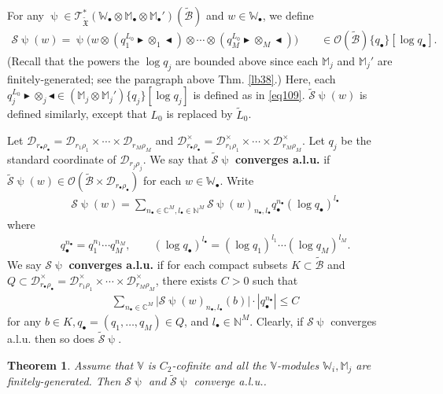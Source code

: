\documentclass[11pt,b5paper,notitlepage]{article}
\theoremstyle{definition}
\theoremstyle{plain}
\newtheorem{thm}[df]{Theorem}
\newcommand{\fk}{\mathfrak}
\newcommand{\mc}{\mathcal}
\newcommand{\wtd}{\widetilde}
\newcommand{\scr}{\mathscr}
\newcommand{\blt}{\bullet}
\newcommand{\Vbb}{\mathbb V}
\newcommand{\Wbb}{\mathbb W}
\newcommand{\Mbb}{\mathbb M}
\newcommand{\Cbb}{\mathbb C}
\newcommand{\Nbb}{\mathbb N}
\newcommand{\btl}{\blacktriangleleft}
\newcommand{\btr}{\blacktriangleright}
\numberwithin{equation}{section}
\begin{document}
For any $\uppsi\in\scr T_{\wtd{\fk X}}^*(\Wbb_\blt\otimes\Mbb_\blt\otimes\Mbb_\blt')(\wtd{\mc B})$ and $w\in\Wbb_\blt$, \index{S@$\wtd{\mc S}\uppsi,\mc S\uppsi$} we define   
\begin{align}
\mc S\uppsi(w)=\uppsi\Big(w\otimes (q_1^{ L_0}\btr\otimes_1\btl)\otimes\cdots\otimes (q_M^{ L_0}\btr\otimes_M\btl)\Big)\qquad \in\scr O(\wtd{\mc B})\{q_\blt\}[\log q_\blt].
\end{align}
(Recall that the powers the $\log q_j$ are bounded above since each $\Mbb_j$ and $\Mbb_j'$ are finitely-generated; see the paragraph above Thm. \ref{lb38}.) Here, each $q_j^{L_0}\btr\otimes_j\btl\in(\Mbb_j\otimes\Mbb_j')\{q_j\}[\log q_j]$ is defined as in \eqref{eq109}. $\wtd{\mc S}\uppsi(w)$ is defined similarly, except that $L_0$ is replaced by $\wtd L_0$.


Let $\mc D_{r_\blt\rho_\blt}=\mc D_{r_1\rho_1}\times\cdots\times\mc D_{r_M\rho_M}$ and $\mc D_{r_\blt\rho_\blt}^\times=\mc D_{r_1\rho_1}^\times\times\cdots\times\mc D_{r_M\rho_M}^\times$. Let $q_j$ be the standard coordinate of $\mc D_{r_j\rho_j}$. We say that $\wtd{\mc S}\uppsi$ \textbf{converges a.l.u.} if $\wtd{\mc S}\uppsi(w)\in\scr O(\wtd{\mc B}\times\mc D_{r_\blt\rho_\blt})$ for each $w\in\Wbb_\blt$. Write
\begin{align*}
\mc S\uppsi(w)=\sum_{n_\blt\in\Cbb^M,l_\blt\in\Nbb^M}\mc S\uppsi(w)_{n_\blt,l_\blt}q_\blt^{n_\blt}(\log q_\blt)^{l_\blt}	
\end{align*}
where 
\begin{align*}
q_\blt^{n_\blt}=q_1^{n_1}\cdots q_M^{n_M},\qquad (\log q_\blt)^{l_\blt}=(\log q_1)^{l_1}\cdots(\log q_M)^{l_M}.	
\end{align*}
We say $\mc S\uppsi$ \textbf{converges a.l.u.} if for each compact subsets $K\subset\wtd{\mc B}$ and $Q\subset\mc D_{r_\blt\rho_\blt}^\times=\mc D_{r_1\rho_1}^\times\times\cdots\times\mc D_{r_M\rho_M}^\times$, there exists $C>0$ such that
\begin{align*}
\sum_{n_\blt\in\Cbb^M}\big|\mc S\uppsi(w)_{n_\blt,l_\blt}(b)\big|\cdot |q_\blt^{n_\blt}|	\leq C
\end{align*}
for any $b\in K,q_\blt=(q_1,\dots,q_M)\in Q$, and $l_\blt\in\Nbb^M$.
Clearly, if $\mc S\uppsi$ converges a.l.u. then so does $\wtd{\mc S}\uppsi$.




\begin{thm}\label{lb55}
Assume that $\Vbb$ is $C_2$-cofinite and all the $\Vbb$-modules $\Wbb_i,\Mbb_j$ are finitely-generated. Then $\mc S\uppsi$ and $\wtd{\mc S}\uppsi$ converge a.l.u..
\end{thm}
\end{document}
